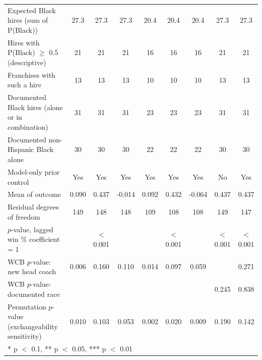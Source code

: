 \begin{table}[H]
{\begin{tabular}[t]{lcccccccc}
Expected Black hires (sum of P(Black)) & 27.3 & 27.3 & 27.3 & 20.4 & 20.4 & 20.4 & 27.3 & 27.3\\
Hires with P(Black) $\geq$ 0.5 (descriptive) & 21 & 21 & 21 & 16 & 16 & 16 & 21 & 21\\
Franchises with such a hire & 13 & 13 & 13 & 10 & 10 & 10 & 13 & 13\\
Documented Black hires (alone or in combination) & 31 & 31 & 31 & 23 & 23 & 23 & 31 & 31\\
Documented non-Hispanic Black alone & 30 & 30 & 30 & 22 & 22 & 22 & 30 & 30\\
Model-only prior control & Yes & Yes & Yes & Yes & Yes & Yes & No & Yes\\
Mean of outcome & 0.090 & 0.437 & -0.014 & 0.092 & 0.432 & -0.064 & 0.437 & 0.437\\
Residual degrees of freedom & 149 & 148 & 148 & 109 & 108 & 108 & 149 & 147\\
$p$-value, lagged win \% coefficient = 1 &  & $<$0.001 &  &  & $<$0.001 &  & $<$0.001 & $<$0.001\\
WCB $p$-value: new head coach & 0.006 & 0.160 & 0.110 & 0.014 & 0.097 & 0.059 &  & 0.271\\
WCB $p$-value: documented race &  &  &  &  &  &  & 0.245 & 0.838\\
Permutation $p$-value (exchangeability sensitivity) & 0.010 & 0.103 & 0.053 & 0.002 & 0.020 & 0.009 & 0.190 & 0.142\\
\bottomrule
\multicolumn{9}{l}{\rule{0pt}{1em}* p $<$ 0.1, ** p $<$ 0.05, *** p $<$ 0.01}\\
\end{tabular}}
\end{table}

